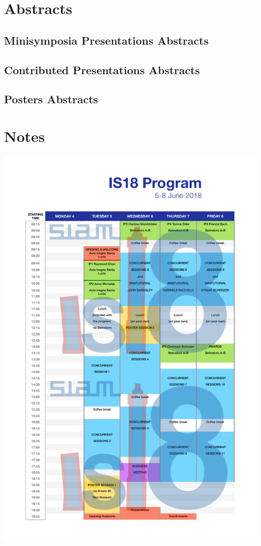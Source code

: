 \documentclass[10pt, a4paper]{book}
\begin{document}
\part{Abstracts}

\chapter*{Minisymposia Presentations Abstracts}


\chapter*{Contributed Presentations Abstracts}

\chapter*{Posters Abstracts}


\part{Notes}
\newpage
\thispagestyle{empty}
\includegraphics[scale=0.6]{program_table.pdf}
%
%
\end{document}
